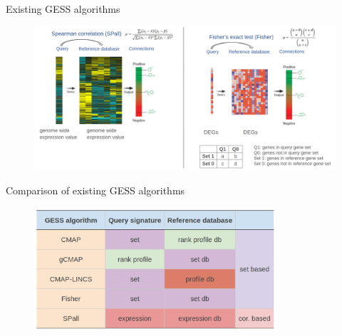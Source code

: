 \documentclass[10pt]{beamer}
\begin{document}
\begin{frame}{Existing GESS algorithms}
  \begin{figure}
      \includegraphics[width=12cm]{demo/images/sp_fisher.png}
  \end{figure}
\end{frame}
\begin{frame}{Comparison of existing GESS algorithms}
\vspace{-0.3cm}
  \begin{figure}
      \includegraphics[width=9cm]{demo/images/cmp_gess.png}
  \end{figure}
\end{frame}
\end{document}
